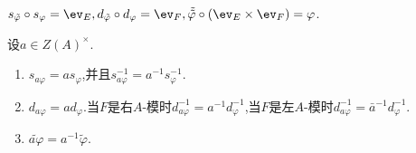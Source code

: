 \begin{proposition}{}{}
	$s_{\tilde{\varphi}}\circ s_{\varphi}=\ev_{E},d_{\tilde{\varphi}}\circ d_{\varphi}=\ev_{F},\tilde{\tilde{\varphi}}\circ\left(\ev_{E}\times\ev_{F}\right)=\varphi$.
\end{proposition}

\begin{proposition}{}{}
	设$a\in Z\left(A\right)^{\times}$.
	\begin{enumerate}
		\item $s_{a\varphi}=as_{\varphi}$,并且$s_{a\varphi}^{-1}=a^{-1}s_{\varphi}^{-1}$.
		\item $d_{a\varphi}=ad_{\varphi}$.当$F$是右$A$-模时$d_{a\varphi}^{-1}=a^{-1}d_{\varphi}^{-1}$,当$F$是左$A$-模时$d_{a\varphi}^{-1}=\bar{a}^{-1}d_{\varphi}^{-1}$.
		\item $\widetilde{a\varphi}=a^{-1}\tilde{\varphi}$.
	\end{enumerate}
\end{proposition}
